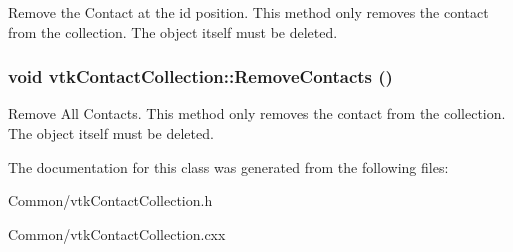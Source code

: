 Remove the Contact at the id position. This method only removes the contact from the collection. The object itself must be deleted. \hypertarget{classvtkContactCollection_a9b85a9624245a174cd43c2c12962fd0c}{
\subsubsection[{RemoveContacts}]{\setlength{\rightskip}{0pt plus 5cm}void vtkContactCollection::RemoveContacts ()}}
\label{classvtkContactCollection_a9b85a9624245a174cd43c2c12962fd0c}


Remove All Contacts. This method only removes the contact from the collection. The object itself must be deleted. 

The documentation for this class was generated from the following files:\begin{DoxyCompactItemize}
\item 
Common/vtkContactCollection.h\item 
Common/vtkContactCollection.cxx\end{DoxyCompactItemize}
